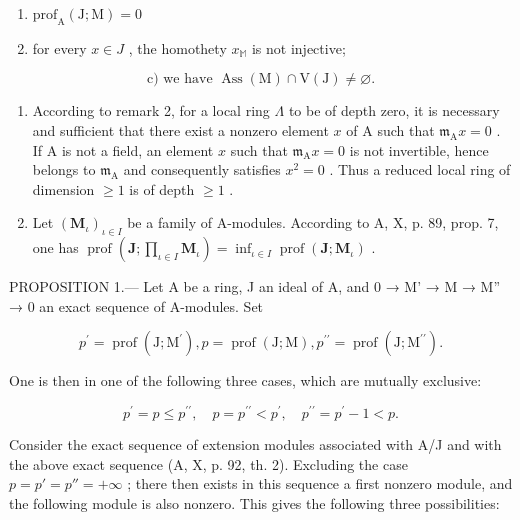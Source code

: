 \begin{enumerate}
\def\labelenumi{\alph{enumi})}
\item
  \(\mathrm{prof}_{\mathrm{A}}(\mathrm{J};\mathrm{M}) = 0\)
\item
  for every \(x \in J\) , the homothety \(x_{\mathbb{M}}\) is not injective;
\end{enumerate}

\[
\mathrm{c)} \text {   we have   } \operatorname{Ass} (\mathrm{M}) \cap \mathrm{V} (\mathrm{J}) \neq \varnothing .
\]

\begin{enumerate}
\def\labelenumi{\arabic{enumi})}
\setcounter{enumi}{2}
\item
  According to remark 2, for a local ring \(\Lambda\) to be of depth zero, it is necessary and sufficient that there exist a nonzero element \(x\) of A such that \(\mathfrak{m}_{\mathrm{A}}x = 0\) . If A is not a field, an element \(x\) such that \(\mathfrak{m}_{\mathrm{A}}x = 0\) is not invertible, hence belongs to \(\mathfrak{m}_{\mathrm{A}}\) and consequently satisfies \(x^{2} = 0\) . Thus a reduced local ring of dimension \(\geqslant 1\) is of depth \(\geqslant 1\) .
\item
  Let \((\mathbf{M}_{\iota})_{\iota \in I}\) be a family of A-modules. According to A, X, p. 89, prop. 7, one has \(\operatorname{prof}(\mathbf{J};\prod_{\iota \in I}\mathbf{M}_{\iota}) = \inf_{\iota \in I}\operatorname{prof}(\mathbf{J};\mathbf{M}_{\iota})\) .
\end{enumerate}

PROPOSITION 1.--- Let A be a ring, J an ideal of A, and 0 → M' → M → M'' → 0 an exact sequence of A-modules. Set

\[
p ^ {\prime} = \operatorname{prof} (\mathrm{J}; \mathrm{M} ^ {\prime}), p = \operatorname{prof} (\mathrm{J}; \mathrm{M}), p ^ {\prime \prime} = \operatorname{prof} (\mathrm{J}; \mathrm{M} ^ {\prime \prime}).
\]

One is then in one of the following three cases, which are mutually exclusive:

\[
p ^ {\prime} = p \leqslant p ^ {\prime \prime}, \quad p = p ^ {\prime \prime} <   p ^ {\prime}, \quad p ^ {\prime \prime} = p ^ {\prime} - 1 <   p.
\]

Consider the exact sequence of extension modules associated with A/J and with the above exact sequence (A, X, p. 92, th. 2). Excluding the case \(p = p' = p'' = +\infty\) ; there then exists in this sequence a first nonzero module, and the following module is also nonzero. This gives the following three possibilities:

